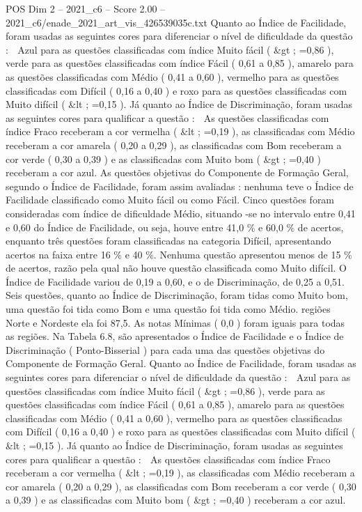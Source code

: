 \begin{textsample}{POS Dim 2 – 2021\_c6 – Score 2.00 – 2021\_c6/enade\_2021\_art\_vis\_426539035c.txt}
Quanto ao Índice de Facilidade, foram usadas as seguintes cores para diferenciar o nível de dificuldade da questão :  Azul para as questões classificadas com índice Muito fácil ( \&gt ; =0,86 ), verde para as questões classificadas com índice Fácil ( 0,61 a 0,85 ), amarelo para as questões classificadas com Médio ( 0,41 a 0,60 ), vermelho para as questões classificadas com Difícil ( 0,16 a 0,40 ) e roxo para as questões classificadas com Muito difícil ( \&lt ; =0,15 ).
Já quanto ao Índice de Discriminação, foram usadas as seguintes cores para qualificar a questão :  As questões classificadas com índice Fraco receberam a cor vermelha ( \&lt ; =0,19 ), as classificadas com Médio receberam a cor amarela ( 0,20 a 0,29 ), as classificadas com Bom receberam a cor verde ( 0,30 a 0,39 ) e as classificadas com Muito bom ( \&gt ; =0,40 ) receberam a cor azul.
As questões objetivas do Componente de Formação Geral, segundo o Índice de Facilidade, foram assim avaliadas : nenhuma teve o Índice de Facilidade classificado como Muito fácil ou como Fácil.
Cinco questões foram consideradas com índice de dificuldade Médio, situando -se no intervalo entre 0,41 e 0,60 do Índice de Facilidade, ou seja, houve entre 41,0 \% e 60,0 \% de acertos, enquanto três questões foram classificadas na categoria Difícil, apresentando acertos na faixa entre 16 \% e 40 \%.
Nenhuma questão apresentou menos de 15 \% de acertos, razão pela qual não houve questão classificada como Muito difícil.
O Índice de Facilidade variou de 0,19 a 0,60, e o de Discriminação, de 0,25 a 0,51.
Seis questões, quanto ao Índice de Discriminação, foram tidas como Muito bom, uma questão foi tida como Bom e uma questão foi tida como Médio. regiões Norte e Nordeste ela foi 87,5.
As notas Mínimas ( 0,0 ) foram iguais para todas as regiões.
Na Tabela 6.8, são apresentados o Índice de Facilidade e o Índice de Discriminação ( Ponto-Bisserial ) para cada uma das questões objetivas do Componente de Formação Geral.
Quanto ao Índice de Facilidade, foram usadas as seguintes cores para diferenciar o nível de dificuldade da questão :  Azul para as questões classificadas com índice Muito fácil ( \&gt ; =0,86 ), verde para as questões classificadas com índice Fácil ( 0,61 a 0,85 ), amarelo para as questões classificadas com Médio ( 0,41 a 0,60 ), vermelho para as questões classificadas com Difícil ( 0,16 a 0,40 ) e roxo para as questões classificadas com Muito difícil ( \&lt ; =0,15 ).
Já quanto ao Índice de Discriminação, foram usadas as seguintes cores para qualificar a questão :  As questões classificadas com índice Fraco receberam a cor vermelha ( \&lt ; =0,19 ), as classificadas com Médio receberam a cor amarela ( 0,20 a 0,29 ), as classificadas com Bom receberam a cor verde ( 0,30 a 0,39 ) e as classificadas com Muito bom ( \&gt ; =0,40 ) receberam a cor azul.

\end{textsample}
